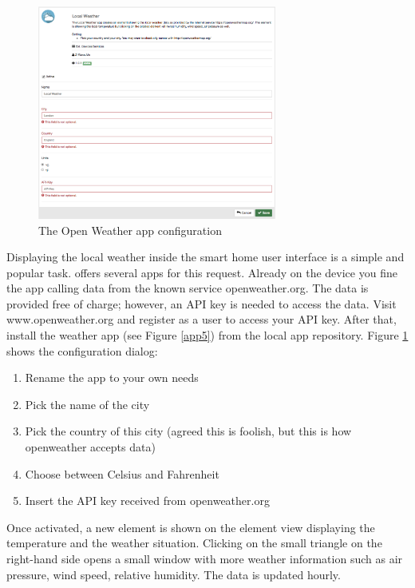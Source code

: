 \begin{figure}
\begin{center}
\includegraphics[width=0.7\textwidth]{pngs/cap6/app6.png}
\caption{The Open Weather app configuration}
\label{app6}
\end{center}
\end{figure}


Displaying the local weather inside the smart home user interface is a simple and popular 
task. \zway offers several apps for this request. Already on the device you fine the 
app  calling data from the known service openweather.org. The 
data is provided free of charge; however, an API key is needed to access the data. 
Visit www.openweather.org and register as a user to access your API key. After that, 
install the weather app  (see Figure \ref{app5}) from the local 
app repository. Figure \ref{app6} shows the configuration dialog:

\begin{enumerate}
\item Rename the app to your own needs
\item Pick the name of the city
\item Pick the country of this city (agreed this is foolish, but this is how openweather accepts data)
\item Choose between Celsius and Fahrenheit
\item Insert the API key received from openweather.org
\end{enumerate}

Once activated, a new element is shown on the element view displaying the temperature 
and the weather situation. Clicking on the small triangle on the right-hand side opens 
a small window with more weather information such as air pressure, wind speed, relative 
humidity. The data is updated hourly.

